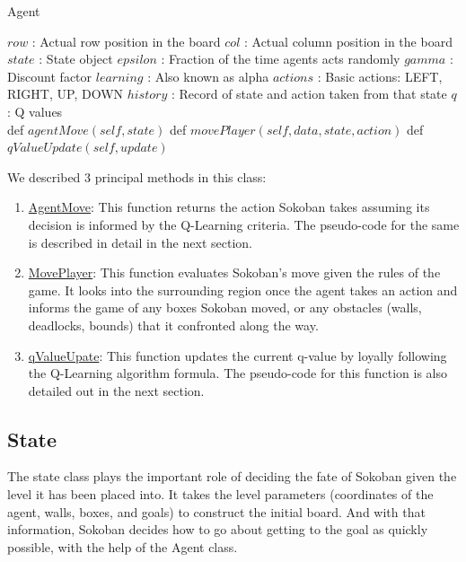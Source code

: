 \documentclass{article}
\begin{document}
\begin{algorithm}
\caption{Agent}
\begin{algorithmic}
  \State $row$ : Actual row position in the board
  \State $col$ : Actual column position in the board
  \State $state$ : State object
  \State $epsilon$ : Fraction of the time agents acts randomly
  \State $gamma$ : Discount factor
  \State $learning$ : Also known as alpha
  \State $actions$ : Basic actions: LEFT, RIGHT, UP, DOWN
  \State $history$ : Record of state and action taken from that state
  \State $q$ : Q values \\
  
  \State def $agentMove(self, state)$
  \State def $movePlayer(self, data, state, action)$
  \State def $qValueUpdate(self, update)$
\EndStruct
\end{algorithmic}
\label{Class}
\end{algorithm}

We described 3 principal methods in this class:
    
\begin{enumerate}[label=\alph*)]
    \item \underline{AgentMove}: This function returns the action Sokoban takes assuming its decision is informed by the Q-Learning criteria. The pseudo-code for the same is described in detail in the next section.
    \item \underline{MovePlayer}: This function evaluates Sokoban's move given the rules of the game. It looks into the surrounding region once the agent takes an action and informs the game of any boxes Sokoban moved, or any obstacles (walls, deadlocks, bounds) that it confronted along the way. 
    \item \underline{qValueUpate}: This function updates the current q-value by loyally following the Q-Learning algorithm formula. The pseudo-code for this function is also detailed out in the next section. 
\end{enumerate}

\subsection{State}
The state class plays the important role of deciding the fate of Sokoban given the level it has been placed into. It takes the level parameters (coordinates of the agent, walls, boxes, and goals) to construct the initial board. And with that information, Sokoban decides how to go about getting to the goal as quickly possible, with the help of the Agent class. 
\end{document}
